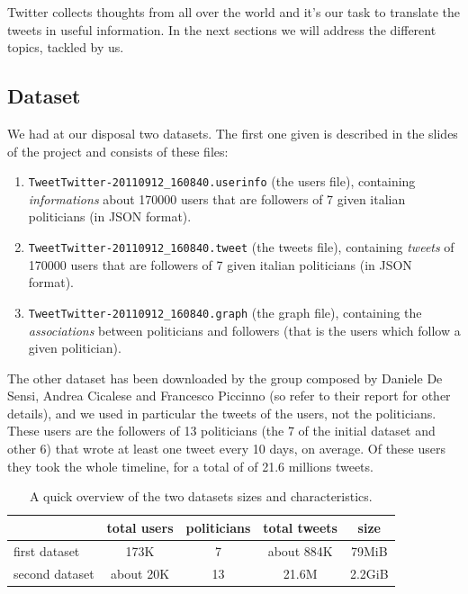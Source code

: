 \documentclass[a4paper,11pt,oneside]{article}
\begin{document}
Twitter collects thoughts from all over the world and it's our task to translate the tweets in useful information.
In the next sections we will address the different topics, tackled by us.

\subsection{Dataset}
We had at our disposal two datasets. The first one given is described in the slides of the project and consists of these files:
\begin{enumerate}
\item \texttt{TweetTwitter-20110912\_160840.userinfo} (the users file), containing \emph{informations} about 170000 users that are followers of 7 given italian politicians  (in JSON format).
\item \texttt{TweetTwitter-20110912\_160840.tweet} (the tweets file), containing \emph{tweets} of 170000 users that are followers of 7 given italian politicians  (in JSON format).
\item \texttt{TweetTwitter-20110912\_160840.graph} (the graph file), containing the \emph{associations} between politicians and followers (that is the users which follow a given politician).
\end{enumerate}

The other dataset has been downloaded by the group composed by Daniele De Sensi, Andrea Cicalese and Francesco Piccinno (so refer to their report for other details), and we used in particular the tweets of the users, not the politicians.
These users are the followers of 13 politicians (the 7 of the initial dataset and other 6) that wrote at least one tweet every 10 days, on average. Of these users they took the whole timeline, for a total of of 21.6 millions tweets.

\begin{table}[h]
\begin{center}
	\begin{tabular}{l | c | c | c | c}
	& total users & politicians & total tweets & size\\ \hline
	first dataset & 173K & 7 & about 884K & 79MiB\\ %
	second dataset & about 20K & 13 & 21.6M & 2.2GiB
	\end{tabular}
\end{center}
\caption{A quick overview of the two datasets sizes and characteristics.}
\end{table}
\end{document}
